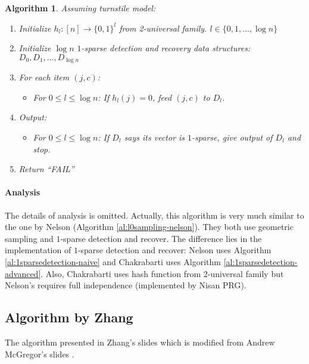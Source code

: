 \documentclass[11pt]{article}
\theoremstyle{plain}
\newtheorem{algorithm}{Algorithm}[section]
\begin{document}
\begin{algorithm}
	\label{al:l0sampling-chakrabarti}
	Assuming turnstile model:
	\begin{enumerate}
		\item Initialize $h_l: [n]\rightarrow \{0,1\}^l$ from 2-universal family. $l\in 
		\{0,1,\dots,\log n\}$
		\item Initialize $\log n$ $1$-sparse detection and recovery data structures: \\
		$D_0, D_1, \dots, D_{\log n}$
		\item For each item $(j,c)$: 
		\begin{itemize}
			\item For $0\leq l \leq \log n$: If $h_l(j)=0$, feed $(j,c)$ to $D_l$. 
		\end{itemize}
		\item Output:
		\begin{itemize}
			\item For $0\leq l \leq \log n$: If $D_l$ says its vector is $1$-sparse, give 
			output of $D_l$ and stop. 
		\end{itemize}
	 \item Return ``FAIL''
	\end{enumerate}
\end{algorithm}

\paragraph{Analysis} The details of analysis is omitted. Actually, this 
algorithm is very much similar to the one by Nelson (Algorithm 
\ref{al:l0sampling-nelson}). They both use geometric sampling and $1$-sparse 
detection and recover. The difference lies in the implementation of $1$-sparse 
detection and recover: Nelson uses Algorithm \ref{al:1sparsedetection-naive} 
and Chakrabarti uses Algorithm \ref{al:1sparsedetection-advanced}. Also, 
Chakrabarti  uses hash function from 2-universal family but Nelson's requires 
full independence (implemented by Nisan PRG). 

\subsection{Algorithm by Zhang}
The algorithm presented in Zhang's slides \cite{zhang2017-slides} which is 
modified from Andrew McGregor's slides \cite{mcgregor2012-slides}.
\end{document}
